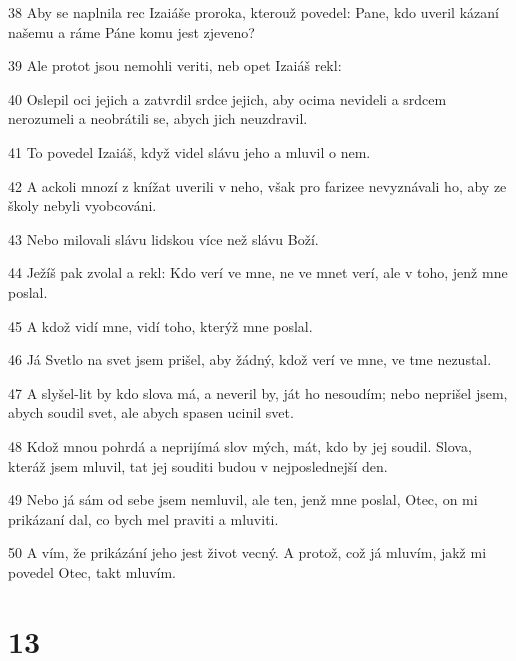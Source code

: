 \par 38 Aby se naplnila rec Izaiáše proroka, kterouž povedel: Pane, kdo uveril kázaní našemu a ráme Páne komu jest zjeveno?
\par 39 Ale protot jsou nemohli veriti, neb opet Izaiáš rekl:
\par 40 Oslepil oci jejich a zatvrdil srdce jejich, aby ocima nevideli a srdcem nerozumeli a neobrátili se, abych jich neuzdravil.
\par 41 To povedel Izaiáš, když videl slávu jeho a mluvil o nem.
\par 42 A ackoli mnozí z knížat uverili v neho, však pro farizee nevyznávali ho, aby ze školy nebyli vyobcováni.
\par 43 Nebo milovali slávu lidskou více než slávu Boží.
\par 44 Ježíš pak zvolal a rekl: Kdo verí ve mne, ne ve mnet verí, ale v toho, jenž mne poslal.
\par 45 A kdož vidí mne, vidí toho, kterýž mne poslal.
\par 46 Já Svetlo na svet jsem prišel, aby žádný, kdož verí ve mne, ve tme nezustal.
\par 47 A slyšel-lit by kdo slova má, a neveril by, ját ho nesoudím; nebo neprišel jsem, abych soudil svet, ale abych spasen ucinil svet.
\par 48 Kdož mnou pohrdá a neprijímá slov mých, mát, kdo by jej soudil. Slova, kteráž jsem mluvil, tat jej souditi budou v nejposlednejší den.
\par 49 Nebo já sám od sebe jsem nemluvil, ale ten, jenž mne poslal, Otec, on mi prikázaní dal, co bych mel praviti a mluviti.
\par 50 A vím, že prikázání jeho jest život vecný. A protož, což já mluvím, jakž mi povedel Otec, takt mluvím.

\chapter{13}

